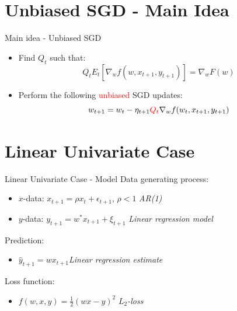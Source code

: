 \documentclass{beamer}
\begin{document}
\section{Unbiased SGD - Main Idea}
\begin{frame}{Main idea - Unbiased SGD}
    \begin{itemize}
        \item Find $Q_t$ such that:\\
        \begin{equation*}
            Q_tE_t[\nabla_w f(w,x_{t+1},y_{t+1})] = \nabla_w F(w)
        \end{equation*}
        \item Perform the following \textcolor{red}{unbiased} SGD updates:\\
        \begin{equation*}
            w_{t+1} = w_t - \eta_{t+1}\textcolor{red}{Q_t}\nabla_w f(w_t,x_{t+1},y_{t+1})
        \end{equation*}
    \end{itemize}
\end{frame}

\section{Linear Univariate Case}
\begin{frame}{Linear Univariate Case - Model}
Data generating process:
\begin{itemize}
    \item $x$-data: $x_{t+1} = \rho x_t + \epsilon_{t+1}$, \;\;$\rho<1$ {\hfill \textit{AR(1)}}
    \item $y$-data: $y_{t+1}=w^*x_{t+1} + \xi_{t+1}$ {\hfill \textit{Linear regression model}}
\end{itemize}
Prediction:
\begin{itemize}
    \item $\hat{y}_{t+1} = wx_{t+1}${\hfill \textit{Linear regression estimate}}
\end{itemize}
Loss function:
\begin{itemize}
    \item $f(w,x,y)=\frac{1}{2}(wx-y)^2$ \hfill\textit{$L_2$-loss}
\end{itemize}
\end{frame}
\end{document}
